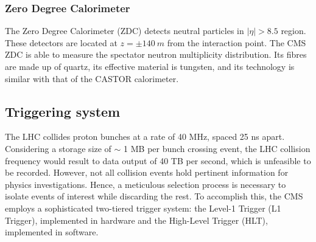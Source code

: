 \subsubsection{\label{subsubsec:exp_CMS_ZDC} Zero Degree Calorimeter}
\noindent The Zero Degree Calorimeter (ZDC) \cite{roland2010forward} detects neutral particles in $|\eta| > 8.5$ region. These detectors are located at $z = \pm 140\: m$ from the interaction point. The CMS ZDC is able to measure the spectator neutron multiplicity distribution. Its fibres are made up of quartz, its effective material is tungsten, and its technology is similar with that of the CASTOR calorimeter.
\subsection{\label{sec:exp_CMS_7}Triggering system}

\noindent The LHC collides proton bunches at a rate of 40 MHz, spaced 25 ns apart. Considering a storage size of $\sim $ 1 MB per bunch crossing event, the LHC collision frequency would result to data output of 40 TB per second, which is unfeasible to be recorded. However, not all collision events hold pertinent information for physics investigations. Hence, a meticulous selection process is necessary to isolate events of interest while discarding the rest. To accomplish this, the CMS employs a sophisticated two-tiered trigger system: the Level-1 Trigger (L1 Trigger), implemented in hardware and the High-Level Trigger (HLT), implemented in software.
